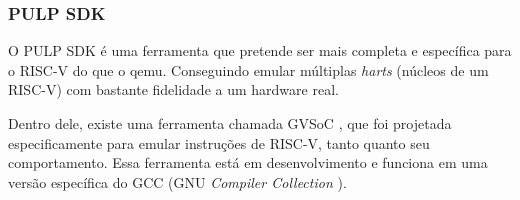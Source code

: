 \subsubsection{PULP SDK}

O PULP SDK \cite{PulpSDKRepositorio} é uma ferramenta que pretende ser mais completa e específica para o RISC-V do que o qemu. 
Conseguindo emular múltiplas \textit{harts} (núcleos de um RISC-V) com bastante fidelidade a um hardware real.

Dentro dele, existe uma ferramenta chamada GVSoC \cite{9643828}, que foi projetada especificamente para emular 
instruções de RISC-V, tanto quanto seu comportamento. Essa ferramenta está em desenvolvimento e funciona em uma versão específica do 
GCC (GNU \textit{Compiler Collection} \cite{GCC}).
